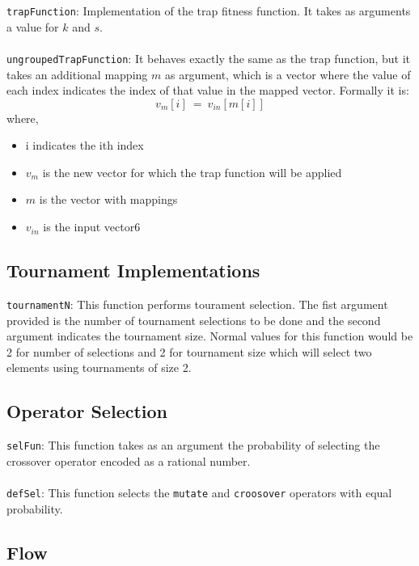 \documentclass[10pt]{article}
\begin{document}
\verb+trapFunction+: Implementation of the trap fitness function. It takes as arguments a value for $k$ and $s$.
\\\\
\verb+ungroupedTrapFunction+: It behaves exactly the same as the trap function, but it takes an additional mapping $m$ as argument, which is a vector where the value of each index indicates the index of that value in the mapped vector. Formally it is:
\[
v_m[i]\ =\ v_{in}[m[i]]
\]
where,
\begin{itemize}
  \item i indicates the ith index
  \item $v_m$ is the new vector for which the trap function will be applied
  \item $m$ is the vector with mappings
  \item $v_{in}$ is the input vector6
\end{itemize}

\subsection{Tournament Implementations}

\verb+tournamentN+: This function performs tourament selection. The fist argument provided is the number of tournament selections to be done and the second argument indicates the tournament size. Normal values for this function would be 2 for number of selections and 2 for tournament size which will select two elements using tournaments of size 2.

\subsection{Operator Selection}
\verb+selFun+: This function takes as an argument the probability of selecting the crossover operator encoded as a rational number.
\\\\
\verb+defSel+: This function selects the \verb+mutate+ and \verb+croosover+ operators with equal probability.

\subsection{Flow}
\end{document}
